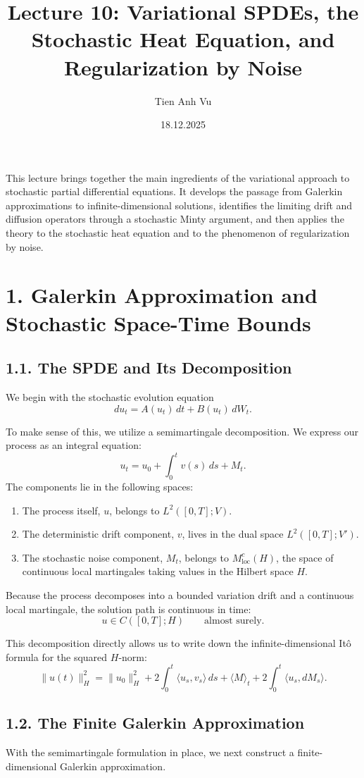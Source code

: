 \documentclass[11pt]{article}
\title{Lecture 10: Variational SPDEs, the Stochastic Heat Equation, and Regularization by Noise}
\date{18.12.2025}
\author{Tien Anh Vu}
\theoremstyle{definition}
\theoremstyle{remark}
\begin{document}
\maketitle

This lecture brings together the main ingredients of the variational approach to stochastic partial differential equations. It develops the passage from Galerkin approximations to infinite-dimensional solutions, identifies the limiting drift and diffusion operators through a stochastic Minty argument, and then applies the theory to the stochastic heat equation and to the phenomenon of regularization by noise.

\section*{1. Galerkin Approximation and Stochastic Space-Time Bounds}

\subsection*{1.1. The SPDE and Its Decomposition}
We begin with the stochastic evolution equation
\[
du_t = A(u_t)\,dt + B(u_t)\,dW_t.
\]

To make sense of this, we utilize a semimartingale decomposition. We express our process as an integral equation:
\[
u_t = u_0 + \int_0^t v(s)\,ds + M_t.
\]
The components lie in the following spaces:
\begin{enumerate}
\item The process itself, \(u\), belongs to \(L^2([0,T];V)\).
\item The deterministic drift component, \(v\), lives in the dual space \(L^2([0,T];V')\).
\item The stochastic noise component, \(M_t\), belongs to \(M_{\mathrm{loc}}^c(H)\), the space of continuous local martingales taking values in the Hilbert space \(H\).
\end{enumerate}

Because the process decomposes into a bounded variation drift and a continuous local martingale, the solution path is continuous in time:
\[
u\in C([0,T];H)
\qquad \text{almost surely}.
\]

This decomposition directly allows us to write down the infinite-dimensional It\^o formula for the squared \(H\)-norm:
\[
\|u(t)\|_H^2
=
\|u_0\|_H^2
+2\int_0^t \langle u_s,v_s\rangle\,ds
+\langle M\rangle_t
+2\int_0^t \langle u_s,dM_s\rangle.
\]

\subsection*{1.2. The Finite Galerkin Approximation}
With the semimartingale formulation in place, we next construct a finite-dimensional Galerkin approximation.
\end{document}
